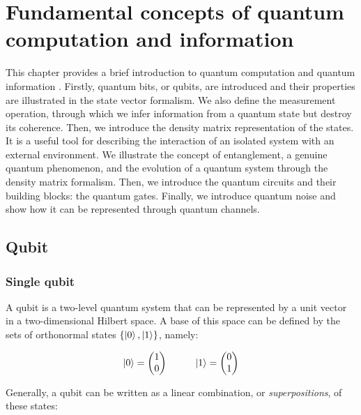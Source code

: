 \chapter{Fundamental concepts of quantum computation and information}
\label{Chapter1}

This chapter provides a brief introduction to quantum computation and quantum information \cite{Nielsen}. Firstly,  quantum bits, or qubits, are introduced and their properties are illustrated in the state vector formalism. We also define the measurement operation, through which we infer information from a quantum state but destroy its coherence. Then, we introduce the density matrix representation of the states. 
It is a useful tool for describing the interaction of an isolated system with an external environment. We illustrate the concept of entanglement, a genuine quantum phenomenon, and the evolution of a quantum system through the density matrix formalism. Then, we introduce the quantum circuits and their building blocks: the quantum gates. Finally, we introduce quantum noise and show how it can be represented through quantum channels. 

\section{Qubit}  

\subsection{Single qubit} 

A qubit is a two-level quantum system that can be represented by a unit vector in a two-dimensional Hilbert space. A base of this space can be defined by the sets of orthonormal states $\{\left| 0 \right \rangle,\left| 1 \right \rangle\}$, namely:

\begin{equation}
 \left| 0 \right \rangle = \begin{pmatrix} 1 \\ 0 \end{pmatrix} \hspace{1cm} \left| 1 \right \rangle = \begin{pmatrix} 0 \\ 1 \end{pmatrix}  
 \label{1_firstchapter}
 \end{equation}

\noindent Generally, a qubit can be written as a linear combination, or \textit{superpositions}, of these states:

